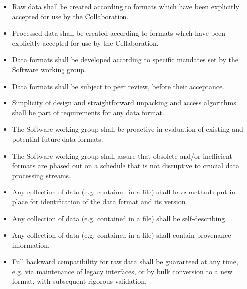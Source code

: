 \begin{itemize}
\item Raw data shall be created according to formats which have been explicitly accepted for use by the Collaboration.

\item Processed data shall be created according to formats which have been explicitly accepted for use by the Collaboration.

\item Data formats shall be developed according to specific mandates set by the Software working group.

\item Data formats shall be subject to peer review, before their acceptance.

\item Simplicity of design and straightforward unpacking and access algorithms shall be part of requirements for any data format.

\item The Software working group shall be proactive in evaluation of existing and potential future data formats.

\item The Software working group shall assure that obsolete and/or inefficient formats are phased out on a schedule that is not disruptive to crucial data processing streams.

\item Any collection of data (e.g. contained in a file) shall have methods put in place for identification of the data format and its version.

\item Any collection of data (e.g. contained in a file) shall be self-describing.

\item Any collection of data (e.g. contained in a file) shall contain provenance information.

\item Full backward compatibility for raw data shall be guaranteed at any time, e.g. via maintenance of legacy interfaces, or by bulk conversion to a new format, with subsequent rigorous validation.
\end{itemize}

